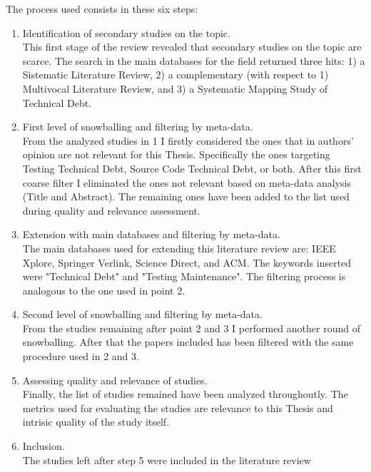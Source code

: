 The process used consists in these six steps:
\begin{enumerate}
    \item Identification of secondary studies on the topic.\\
        This first stage of the review revealed that secondary studies on the topic are scarce. The search in the main databases for the field returned three hits: 1) a Sistematic Literature Review, 2) a complementary (with respect to 1) Multivocal Literature Review, and 3) a Systematic Mapping Study of Technical Debt.
        
    \item First level of snowballing and filtering by meta-data.\\
        From the analyzed studies in 1 I firstly considered the ones that in authors' opinion are not relevant for this Thesis. Specifically the ones targeting Testing Technical Debt, Source Code Technical Debt, or both. After this first coarse filter I eliminated the ones not relevant based on meta-data analysis (Title and Abstract). The remaining ones have been added to the list used during quality and relevance assessment. 
        
    \item Extension with main databases and filtering by meta-data.\\
        The main databases used for extending this literature review are: IEEE Xplore, Springer Verlink, Science Direct, and ACM. The keywords inserted were "Technical Debt" and "Testing Maintenance". The filtering process is analogous to the one used in point 2.
    
    
    \item Second level of snowballing and filtering by meta-data.\\
        From the studies remaining after point 2 and 3 I performed another round of snowballing. After that the papers included has been filtered with the same procedure used in 2 and 3.
    
    
    \item Assessing quality and relevance of studies.\\
        Finally, the list of studies remained have been analyzed throughoutly. The metrics used for evaluating the studies are relevance to this Thesis and intrisic quality of the study itself. 
    
    
    \item Inclusion.\\
        The studies left after step 5 were included in the literature review
    
\end{enumerate}





